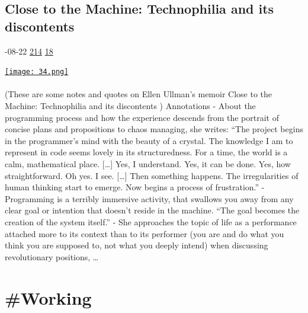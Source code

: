 \documentclass[10pt,a4paper]{article}
\begin{document}
\begin{multicols}{2}
\begin{minipage}{\linewidth}
\subsection{Close to the Machine: Technophilia and its discontents}
\textsc{\footnotesize
{\scriptsize\faCalendar}-08-22 
{\scriptsize\faThumbsOUp}\space 
\href{http://news.ycombinator.com/item?id=37221487\&utm\_term=comment}{214} 
{\scriptsize\faComments}\space 
\href{http://news.ycombinator.com/item?id=37221487\&utm\_term=comment}{18} 
}
\par\medskip\noindent
\href{https://manu.zone/books/close-to-the-machine/?utm\_source=hackernewsletter\&utm\_medium=email\&utm\_term=books}{
    \texttt{[image: 34.png]}
}
\end{minipage}
\paragraph{}
(These are some notes and quotes on Ellen Ullman’s memoir Close to the Machine: Technophilia and its discontents )
Annotations
- About the programming process and how the experience descends from the portrait of concise plans and propositions to chaos managing, she writes:
“The project begins in the programmer’s mind with the beauty of a crystal. The knowledge I am to represent in code seems lovely in its structuredness. For a time, the world is a calm, mathematical place. […] Yes, I understand. Yes, it can be done. Yes, how straightforward. Oh yes. I see. […] Then something happens. The irregularities of human thinking start to emerge. Now begins a process of frustration.”
- Programming is a terribly immersive activity, that swallows you away from any clear goal or intention that doesn’t reside in the machine. “The goal becomes the creation of the system itself.”
- She approaches the topic of life as a performance attached more to its context than to its performer (you are and do what you think you are supposed to, not what you deeply intend) when discussing revolutionary positions,
\dots\par
\end{multicols}

\newpage
\section{\#Working}
\end{document}
